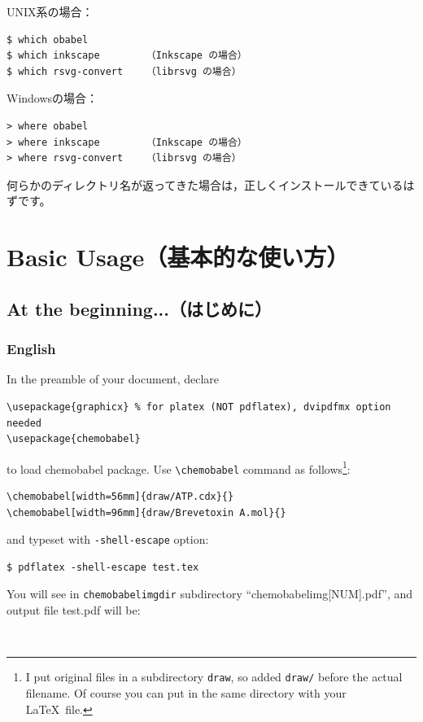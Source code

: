 \documentclass[12pt]{ltjsarticle}
\begin{document}
UNIX系の場合：
\begin{verbatim}
$ which obabel
$ which inkscape        （Inkscape の場合）
$ which rsvg-convert    （librsvg の場合）
\end{verbatim}

Windowsの場合：
\begin{verbatim}
> where obabel
> where inkscape        （Inkscape の場合）
> where rsvg-convert    （librsvg の場合）
\end{verbatim}

何らかのディレクトリ名が返ってきた場合は，正しくインストールできているはずです。

\clearpage

\section{Basic Usage（基本的な使い方）} \label{basic}

\subsection{At the beginning...（はじめに）}

\subsubsection{English}
In the preamble of your document, declare
\begin{verbatim}
\usepackage{graphicx} % for platex (NOT pdflatex), dvipdfmx option needed
\usepackage{chemobabel}
\end{verbatim}
to load \textsf{chemobabel} package.
Use \verb|\chemobabel| command as follows\footnote{I put original files
in a subdirectory \texttt{draw}, so added \texttt{draw/} before the actual
filename. Of course you can put in the same directory with your \LaTeX\ file.}:
\begin{verbatim}
\chemobabel[width=56mm]{draw/ATP.cdx}{}
\chemobabel[width=96mm]{draw/Brevetoxin A.mol}{}
\end{verbatim}
and typeset with \verb|-shell-escape| option:
\begin{verbatim}
$ pdflatex -shell-escape test.tex
\end{verbatim}
You will see in \verb|chemobabelimgdir| subdirectory ``chemobabelimg[NUM].pdf'',
and output file test.pdf will be:
\begin{figure}[h]
  \centering
   \\
\end{figure}
\end{document}
